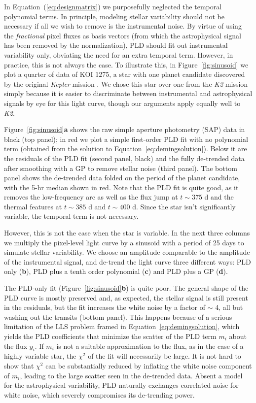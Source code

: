 \documentclass[]{emulateapj}
\begin{document}
In Equation~(\ref{eq:designmatrix}) we purposefully neglected the temporal polynomial
terms. In principle, modeling stellar variability should not be necessary if all we wish 
to remove is the instrumental noise. By virtue of using the
\emph{fractional} pixel fluxes as basis vectors (from which the astrophysical signal
has been removed by the normalization), PLD should fit out instrumental variability only,
obviating the need for an extra temporal term. However, in practice, this is not always
the case. To illustrate this, in Figure~\ref{fig:sinusoid} we plot a quarter of data
of KOI 1275, a star with one planet candidate discovered by the original \emph{Kepler}
mission \citep{BOR11}. We chose this star over one from the \emph{K2}
mission simply because it is easier to discriminate between instrumental and
astrophysical signals by eye for this light curve, though our arguments apply
equally well to \emph{K2}.

Figure~\ref{fig:sinusoid}\textbf{a} shows the raw simple aperture photometry (SAP) data in black (top
panel); in red we plot a simple first-order PLD fit with no polynomial term (obtained
from the solution to Equation~\ref{eq:demingsolution}). Below it are 
the residuals of the PLD fit (second panel, black) and the fully de-trended data after 
smoothing with a GP to remove stellar noise (third panel). The bottom panel shows 
the de-trended data folded on the period of the planet candidate, with the 5-hr 
median shown in red. Note that the PLD fit is quite good, as it removes the
low-frequency arc as well as the flux jump at $t \sim 375$ d and the thermal 
features at $t \sim 385$ d and $t \sim 400$ d. Since the star
isn't significantly variable, the temporal term is not necessary.

However, this is not the case when the star is variable. In the next three columns 
we multiply the pixel-level light curve by a sinusoid 
with a period of 25 days to simulate stellar variability. We choose an amplitude 
comparable to the amplitude of the instrumental signal, and de-trend the light 
curve three different ways: PLD only (\textbf{b}), PLD plus a tenth order 
polynomial (\textbf{c}) and PLD plus a GP (\textbf{d}).

The PLD-only fit (Figure~\ref{fig:sinusoid}\textbf{b}) is quite poor. The general shape of the PLD
curve is mostly preserved and, as expected, the stellar signal is still present 
in the residuals, but the fit increases the white noise by a factor of $\sim$ 4,
all but washing out the transits (bottom panel). This happens because of a
serious limitation of the LLS problem framed in Equation~\ref{eq:demingsolution}, 
which yields the PLD coefficients that minimize the scatter of the PLD term $m_i$ 
about the flux $y_i$. If $m_i$ is not a suitable approximation to the flux, as in the case
of a highly variable star, the $\chi^2$ of the fit will necessarily be large.
It is not hard to show that $\chi^2$ can be substantially reduced
by inflating the white noise component of $m_i$, leading to the large scatter
seen in the de-trended data. Absent a model for the astrophysical variability,
PLD naturally exchanges correlated noise for white noise, which severely
compromises its de-trending power. 
\end{document}
